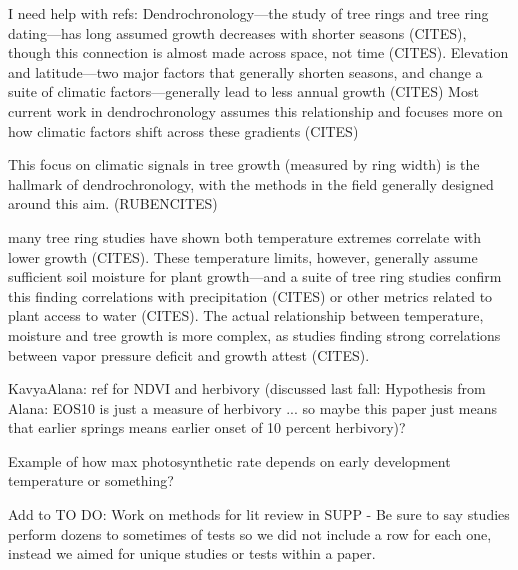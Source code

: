 I need help with refs:
Dendrochronology---the study of tree rings and tree ring dating---has long assumed growth decreases with shorter seasons (CITES), though this connection is almost made across space, not time (CITES).
 Elevation and latitude---two major factors that generally shorten seasons, and change a suite of climatic factors---generally lead to less annual growth (CITES)
 Most current work in dendrochronology assumes this relationship and focuses more on how climatic factors shift across these gradients (CITES)
 
 This focus on climatic signals in tree growth (measured by ring width) is the hallmark of dendrochronology, with the methods in the field generally designed around this aim. (RUBENCITES)

many tree ring studies have shown both temperature extremes correlate with lower growth (CITES). These temperature limits, however, generally assume sufficient soil moisture for plant growth---and a suite of tree ring studies confirm this finding correlations with precipitation (CITES) or other metrics related to plant access to water (CITES). The actual relationship between temperature, moisture and tree growth is more complex, as studies finding strong correlations between vapor pressure deficit and growth attest (CITES). 

KavyaAlana: ref for NDVI and herbivory (discussed last fall: Hypothesis from Alana: EOS10 is just a measure of herbivory ... so maybe this paper just means that earlier springs means earlier onset of 10 percent herbivory)? 

Example of how max photosynthetic rate depends on early development temperature or something? 

Add to TO DO: Work on methods for lit review in SUPP
- Be sure to say studies perform dozens to sometimes of tests so we did not include a row for each one, instead we aimed for unique studies or tests within a paper. 
